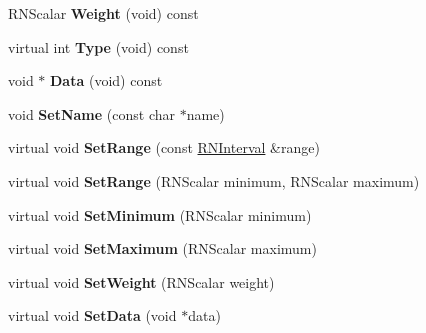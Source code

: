 \begin{DoxyCompactItemize}
\item 
R\+N\+Scalar {\bfseries Weight} (void) const \hypertarget{class_r3_surfel_feature_a89e1c27364b98b89009e72e549b9261a}{}\label{class_r3_surfel_feature_a89e1c27364b98b89009e72e549b9261a}

\item 
virtual int {\bfseries Type} (void) const \hypertarget{class_r3_surfel_feature_ae7763c09c37c422f9e5e28481ce3e542}{}\label{class_r3_surfel_feature_ae7763c09c37c422f9e5e28481ce3e542}

\item 
void $\ast$ {\bfseries Data} (void) const \hypertarget{class_r3_surfel_feature_a6d2baba218003058d2f7a21490c93ea2}{}\label{class_r3_surfel_feature_a6d2baba218003058d2f7a21490c93ea2}

\item 
void {\bfseries Set\+Name} (const char $\ast$name)\hypertarget{class_r3_surfel_feature_adf9b0381db158f9aae6858357607ba84}{}\label{class_r3_surfel_feature_adf9b0381db158f9aae6858357607ba84}

\item 
virtual void {\bfseries Set\+Range} (const \hyperlink{class_r_n_interval}{R\+N\+Interval} \&range)\hypertarget{class_r3_surfel_feature_af46dfd154f0a792f202948238c0c504c}{}\label{class_r3_surfel_feature_af46dfd154f0a792f202948238c0c504c}

\item 
virtual void {\bfseries Set\+Range} (R\+N\+Scalar minimum, R\+N\+Scalar maximum)\hypertarget{class_r3_surfel_feature_ad9b298e35f4375e9da94e839b5457143}{}\label{class_r3_surfel_feature_ad9b298e35f4375e9da94e839b5457143}

\item 
virtual void {\bfseries Set\+Minimum} (R\+N\+Scalar minimum)\hypertarget{class_r3_surfel_feature_aabf0524e4441c2d12626f2bfad398ee6}{}\label{class_r3_surfel_feature_aabf0524e4441c2d12626f2bfad398ee6}

\item 
virtual void {\bfseries Set\+Maximum} (R\+N\+Scalar maximum)\hypertarget{class_r3_surfel_feature_a6e9fc7a69072ba80f33f40df98626c22}{}\label{class_r3_surfel_feature_a6e9fc7a69072ba80f33f40df98626c22}

\item 
virtual void {\bfseries Set\+Weight} (R\+N\+Scalar weight)\hypertarget{class_r3_surfel_feature_a7392743c3193895d8ccba5f453b1b034}{}\label{class_r3_surfel_feature_a7392743c3193895d8ccba5f453b1b034}

\item 
virtual void {\bfseries Set\+Data} (void $\ast$data)\hypertarget{class_r3_surfel_feature_a41420480903d487ab057be566811a451}{}\label{class_r3_surfel_feature_a41420480903d487ab057be566811a451}


\end{DoxyCompactItemize}
